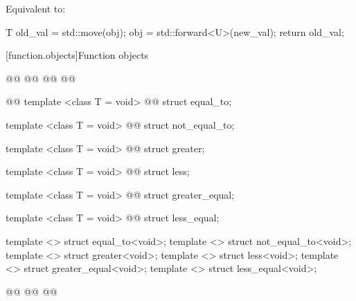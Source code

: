 \begin{itemdescr}
\pnum
\effects
Equivalent to:

\begin{codeblock}
T old_val = std::move(obj);
obj = std::forward<U>(new_val);
return old_val;
\end{codeblock}
\end{itemdescr}

\setcounter{section}{8}
[function.objects]{Function objects}

\setcounter{Paras}{1}
\pnum
{}

\begin{codeblock}
@@
  @@
  @@
  @@

  @@
  template <class T = void>
    @@
  struct equal_to;

  template <class T = void>
    @@
  struct not_equal_to;

  template <class T = void>
    @@
  struct greater;

  template <class T = void>
    @@
  struct less;

  template <class T = void>
    @@
  struct greater_equal;

  template <class T = void>
    @@
  struct less_equal;

  template <> struct equal_to<void>;
  template <> struct not_equal_to<void>;
  template <> struct greater<void>;
  template <> struct less<void>;
  template <> struct greater_equal<void>;
  template <> struct less_equal<void>;

  @@
  @@
@\added{\}\}\}\}}@
\end{codeblock}

